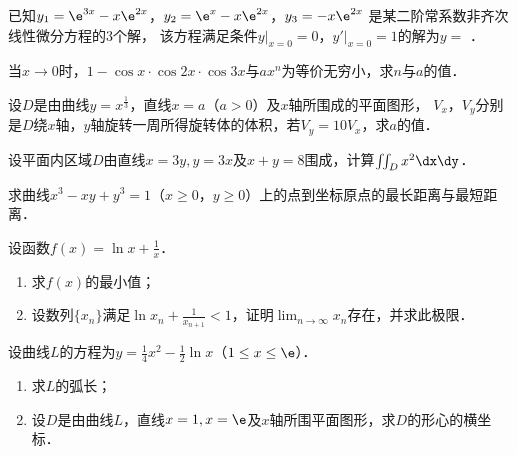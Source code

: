 \documentclass[plain,noanswer,medmath]{../../template/jnuexam}
\begin{document}
\begin{problem}
已知$y_1 = \e^{3x} - x\e^{2x}$，$y_2 = \e^x - x\e^{2x}$，$y_3 = - x\e^{2x}$
是某二阶常系数非齐次线性微分方程的$3$个解，
该方程满足条件$y\big|_{x = 0} = 0$，$y'\big|_{x = 0} = 1$的解为$y =$ \fillin{}．
\end{problem}






\begin{problem}[points=10]
当$x \to 0$时，$1 - \cos x \cdot \cos 2x \cdot \cos 3x$与$ax^n$为等价无穷小，求$n$与$a$的值．
\end{problem}


\begin{problem}[points=10]
设$D$是由曲线$y = x^{\frac{1}{3}}$，直线$x = a$（$a > 0$）及$x$轴所围成的平面图形，
$V_x$，$V_y$分别是$D$绕$x$轴，$y$轴旋转一周所得旋转体的体积，若$V_y = 10V_x$，求$a$的值．
\end{problem}


\begin{problem}[points=10]
设平面内区域$D$由直线$x = 3y,y = 3x$及$x + y = 8$围成，计算$\iint_D x^2 \dx\dy$．
\end{problem}




\begin{problem}[points=11]
求曲线$x^3 - xy + y^3 = 1$（$x \ge 0$，$y \ge 0$）上的点到坐标原点的最长距离与最短距离．
\end{problem}


\begin{problem}[points=11]
设函数$f(x) = \ln x + \frac{1}{x}$．
\begin{enumerate}
\item
求$f(x)$的最小值；
\item
设数列$\{x_n\}$满足$\ln x_n + \frac{1}{x_{n + 1}} < 1$，证明$\lim_{n \to \infty} x_n$存在，并求此极限．
\end{enumerate}
\end{problem}


\begin{problem}[points=11]
设曲线$L$的方程为$y = \frac{1}{4}x^2 - \frac{1}{2}\ln x$（$1 \le x \le \e$）．
\begin{enumerate}
\item 求$L$的弧长；
\item 设$D$是由曲线$L$，直线$x = 1,x = \e$及$x$轴所围平面图形，求$D$的形心的横坐标．
\end{enumerate}
\end{problem}




\end{document}
